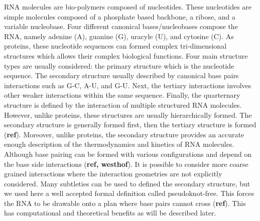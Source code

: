 \documentclass[a4paper,12pt]{article}
\begin{document}
RNA molecules are bio-polymers composed of nucleotides. These nucleotides are
simple molecules composed of a phosphate based backbone, a ribose, and a
variable nucleobase. Four different canonical bases/nucleobases compose the RNA,
namely adenine (A), guanine (G), uracyle (U), and cytosine (C). As proteins,
these nucleotide sequences can formed complex tri-dimensional structures which
allows their complex biological functions. Four main structure types are usually
considered: the primary structure which is the nucleotide sequence. The
secondary structure usually described by canonical base pairs interactions such
as G-C, A-U, and G-U. Next, the tertiary interactions involves other weaker
interactions within the same sequence. Finally, the quarternary structure is
defined by the interaction of multiple structured RNA molecules. However, unlike
proteins, these structures are usually hierarchically formed. The secondary
structure is generally formed first, then the tertiary structure is formed
(\textbf{ref}). Moreover, unlike proteins, the secondary structure provides an accurate
enough description of the thermodynamics and kinetics of RNA molecules. Although
base pairing can be formed with various configurations and depend on the base
side interactions (\textbf{ref, westhof}). It is possible to consider more coarse
grained interactions where the interaction geometries are not explicitly
considered. Many subtleties can be used to defined the secondary structure, but
we used here a well accepted formal definition called pseudoknot-free. This
forces the RNA to be drawable onto a plan where base pairs cannot cross (\textbf{ref}).
This has computational and theoretical benefits as will be described later.
\end{document}
